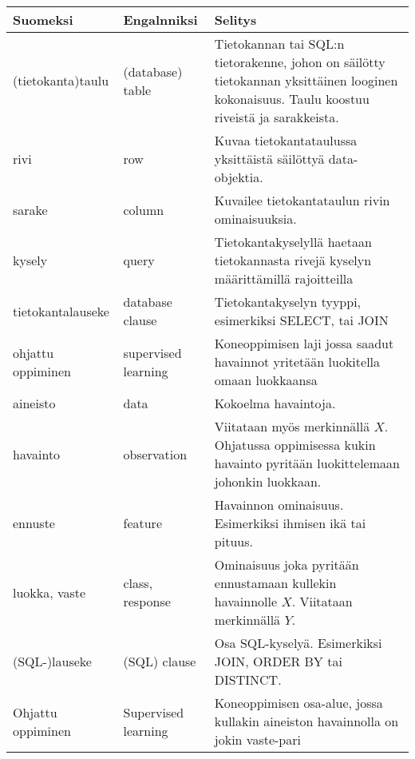 \documentclass[finnish,twoside,openright]{HYgraduMLDS}
\begin{document}
\begin{center}
    \begin{tabular}{|| m{3cm} | m{3cm} | m{8cm} ||} 
        \hline
        Suomeksi                                    & Engalnniksi           &   Selitys \\ [0.5ex] 
        \hline\hline
        (tietokanta)taulu                           & (database) table      & Tietokannan tai SQL:n tietorakenne, johon on säilötty tietokannan yksittäinen looginen kokonaisuus. Taulu koostuu riveistä ja sarakkeista. \\ 
        \hline
        rivi                                        & row                   & Kuvaa tietokantataulussa yksittäistä säilöttyä data-objektia. \\
        \hline
        sarake                                      & column                & Kuvailee tietokantataulun rivin ominaisuuksia. \\
        \hline
        kysely                                      & query                 & Tietokantakyselyllä haetaan tietokannasta rivejä kyselyn määrittämillä rajoitteilla \\
        \hline
        tietokantalauseke                           & database clause       & Tietokantakyselyn tyyppi, esimerkiksi SELECT, tai JOIN \\
        \hline
        ohjattu oppiminen \label{term:supervised}   & supervised learning   & Koneoppimisen laji jossa saadut havainnot yritetään luokitella omaan luokkaansa \\
        \hline
        aineisto                                    & data                  & Kokoelma havaintoja. \\
        \hline
        havainto                                    & observation           & Viitataan myös merkinnällä $X$. Ohjatussa oppimisessa kukin havainto pyritään luokittelemaan johonkin luokkaan. \\
        \hline
        ennuste                                     & feature               & Havainnon ominaisuus. Esimerkiksi ihmisen ikä tai pituus. \\
        \hline
        luokka, vaste                               & class, response       & Ominaisuus joka pyritään ennustamaan kullekin havainnolle $X$. Viitataan merkinnällä $Y$. \\
        \hline
        (SQL-)lauseke                               & (SQL) clause          & Osa SQL-kyselyä. Esimerkiksi JOIN, ORDER BY tai DISTINCT. \\
        \hline
        Ohjattu oppiminen                           & Supervised learning   & Koneoppimisen osa-alue, jossa kullakin aineiston havainnolla on jokin vaste-pari \\ [1ex] 
        \hline
    \end{tabular}
\end{center}
\end{document}

